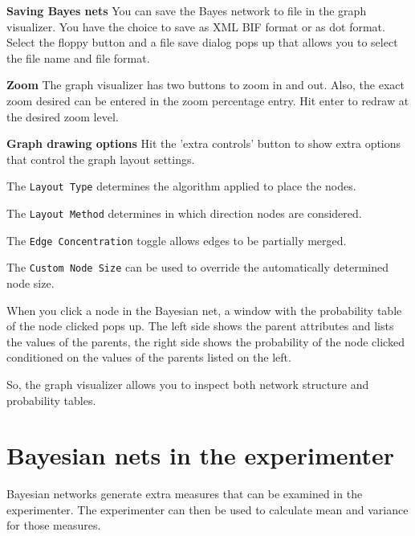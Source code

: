 \documentclass{article}
\begin{document}
{\bf Saving Bayes nets} You can save the Bayes network to file in the graph visualizer.
You have the choice to save as XML BIF format or as dot format. Select the floppy button
and a file save dialog pops up that allows you to select the file name and file format.

{\bf Zoom} The graph visualizer has two buttons to zoom in and out. Also, the exact zoom
desired can be entered in the zoom percentage entry. Hit enter to redraw at the desired zoom
level.

{\bf Graph drawing options} Hit the 'extra controls' button to show extra options that
control the graph layout settings.

\begin{center}
\end{center}

The {\tt Layout Type} determines the algorithm applied to place the nodes.

The {\tt Layout Method} determines in which direction nodes are considered.

The {\tt Edge Concentration} toggle allows edges to be partially merged.

The {\tt Custom Node Size} can be used to override the automatically determined node size.

When you click a node in the Bayesian net, a window with the probability table of the node 
clicked pops up. The left side shows the parent attributes and lists the values of the
parents, the right side shows the probability of the node clicked conditioned on the 
values of the parents listed on the left.

\begin{center}
\end{center}

So, the graph visualizer allows you to inspect both network structure and probability tables. 

\section{Bayesian nets in the experimenter}

Bayesian networks generate extra measures that can be examined in the experimenter.
The experimenter can then be used to calculate mean and variance for those measures.
\end{document}

